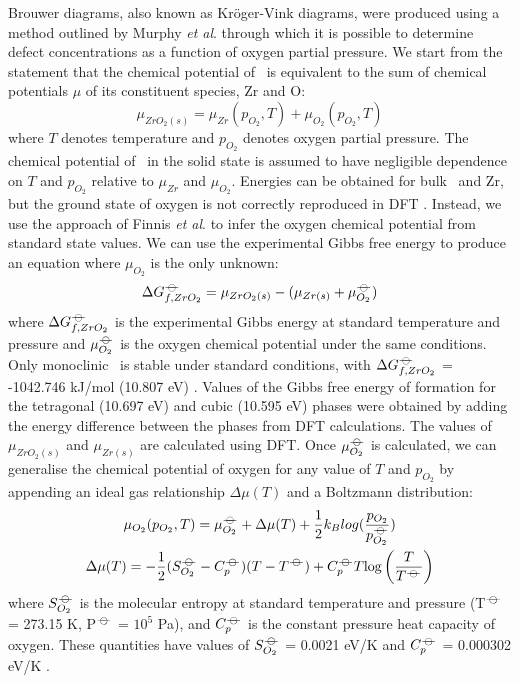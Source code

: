 Brouwer diagrams, also known as Kr{\"o}ger-Vink diagrams, were produced using a method outlined by Murphy \emph{et al}. \cite{Murphy2014, Murphy2014a} through which it is possible to determine defect concentrations as a function of oxygen partial pressure. We start from the statement that the chemical potential of \zirconia\ is equivalent to the sum of chemical potentials $\mu$ of its constituent species, Zr and O:
\begin{equation}
{\mu}_{ZrO_2(s)} = {\mu}_{Zr}(p_{O_2}, T) + {\mu}_{O_{2}}(p_{O_{2}}, T)
\label{mewZrO2compmethodology}
\end{equation}
where $T$ denotes temperature and $p_{O_2}$ denotes oxygen partial pressure. The chemical potential of \zirconia\ in the solid state is assumed to have negligible dependence on $T$ and $p_{O_2}$ relative to ${\mu}_{Zr}$ and ${\mu}_{O_2}$. Energies can be obtained for bulk \zirconia\ and Zr, but the ground state of oxygen is not correctly reproduced in DFT \cite{Batyrev2000,Lozovoi2001}. Instead, we use the approach of Finnis \emph{et al}. \cite{Finnis2005} to infer the oxygen chemical potential from standard state values. We can use the experimental Gibbs free energy to produce an equation where $\mu_{O_2}$ is the only unknown:
\begin{equation}
\Delta{G^{{\ensuremath{-\kern-4pt{\ominus}\kern-4pt-}}}_{f, ZrO_2}} = \mu_{ZrO_2(s)} - (\mu_{Zr(s)} + \mu^{{-\kern-4pt{\ominus}\kern-4pt-}}_{O_2})
\end{equation}
where $\Delta{G^{{\ensuremath{-\kern-4pt{\ominus}\kern-4pt-}}}_{f, ZrO_2}}$ is the experimental Gibbs energy at standard temperature and pressure and $\mu^{{-\kern-4pt{\ominus}\kern-4pt-}}_{O_2}$ is the oxygen chemical potential under the same conditions. Only monoclinic \zirconia\ is stable under standard conditions, with $\Delta{G^{{\ensuremath{-\kern-4pt{\ominus}\kern-4pt-}}}_{f, ZrO_2}}$ = -1042.746 kJ/mol (10.807 eV) \cite{brown2005chemical}. Values of the Gibbs free energy of formation for the tetragonal (10.697 eV) and cubic (10.595 eV) phases were obtained by adding the energy difference between the phases from DFT calculations. The values of $\mu_{ZrO_2(s)}$ and $\mu_{Zr(s)}$ are calculated using DFT. Once $\mu^{{-\kern-4pt{\ominus}\kern-4pt-}}_{O_2}$ is calculated, we can generalise the chemical potential of oxygen for any value of $T$ and $p_{O_2}$ by appending an ideal gas relationship $\Delta{\mu(T)}$ and a Boltzmann distribution:
\begin{gather}
\mu_{O_2}(p_{O_2},T) = \mu^{\plimsoll}_{O_2} + \Delta{\mu(T)} + \frac{1}{2}{k_B}log(\frac{p_{O_2}}{p^{\plimsoll}_{O_2}}) \\
\Delta \mu(T) = -\frac{1}{2}(S^{\plimsoll}_{O_{2}}- C^{\plimsoll}_{p})(T-T^{\plimsoll}) + C^{\plimsoll}_{p}T\textup{log}\left ( \frac{T}{T^{\plimsoll}} \right )
\end{gather} 
where $S^{{-\kern-4pt{\ominus}\kern-4pt-}}_{O_{2}}$ is the molecular entropy at standard temperature and pressure (T$^{{-\kern-4pt{\ominus}\kern-4pt-}}$ = 273.15 K, P$^{{-\kern-4pt{\ominus}\kern-4pt-}}$ = $10^{5}$ Pa), and $C^{{-\kern-4pt{\ominus}\kern-4pt-}}_{p}$ is the constant pressure heat capacity of oxygen. These quantities have values of $S^{{-\kern-4pt{\ominus}\kern-4pt-}}_{O_{2}}$ = 0.0021 eV/K and $C^{{-\kern-4pt{\ominus}\kern-4pt-}}_{p}$ = 0.000302 eV/K \cite{weast1984crc}. 

